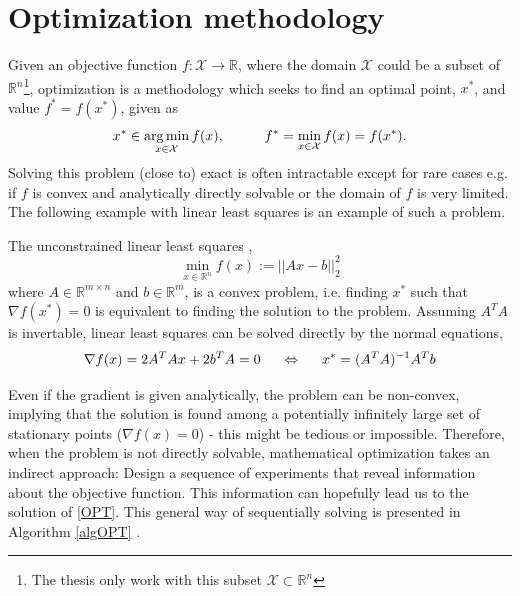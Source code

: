 \section{Optimization methodology}
Given an objective function $f: \mathcal{X} \rightarrow \mathbb{R}$, where the domain $\mathcal{X}$
could be a subset of $\mathbb{R}^n$\footnote{The thesis only work with this subset $\mathcal{X}
\subset \mathbb{R}^n$}, optimization is a methodology which seeks to find an optimal point, $x^*$,
and value $f^* = f(x^*)$, given as
\begin{align}\label{OPT}
    x^* \in \operatorname*{arg\,min}_{x \in \mathcal{X}} f(x), \hspace{1cm} f^* = \min_{x \in \mathcal{X}} f(x) = f(x^*).
\end{align}
Solving this problem (close to) exact is often intractable except for rare cases e.g. if $f$ is 
convex and analytically directly solvable or the domain of $f$ is very limited. The following example
with linear least squares is an example of such a problem. 

\begin{testexample}
    The unconstrained linear least squares \cite{boyd2004convex}, $$\min_{x\in \mathbb{R}^n} f(x) := ||Ax-b||_2^2$$
    where $A \in \mathbb{R}^{m\times n}$ and $b \in \mathbb{R}^m$, is a convex problem,
    i.e. finding $x^*$ such that $\nabla f(x^*) = 0$ is equivalent to finding the solution
    to the problem. Assuming $A^TA$ is invertable, linear least squares can be solved
    directly by the normal equations, 
    $$\nabla f(x) = 2A^TAx + 2b^TA = 0 \hspace{0.5cm} \Leftrightarrow \hspace{0.5cm} x^* = (A^TA)^{-1} A^Tb$$
\end{testexample}
Even if the gradient is given analytically, the problem can be non-convex, implying that the
solution is found among a potentially infinitely large set of stationary points ($\nabla f(x) = 0$)
- this might be tedious or impossible. Therefore, when the problem is not directly solvable,
mathematical optimization takes an indirect approach: Design a sequence of experiments that reveal
information about the objective function. This information can hopefully lead us to the solution of
\eqref{OPT}. This general way of sequentially solving is presented in Algorithm \ref{algOPT}
\cite{bayesoptbook}. 

